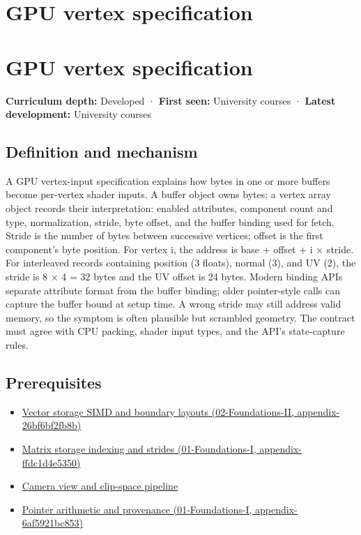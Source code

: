\hypertarget{appendix-749ba51a6c25}{}
\section*{GPU vertex specification}
\section{GPU vertex specification}\label{gpu-vertex-specification}

\textbf{Curriculum depth:} Developed · \textbf{First seen:} University courses · \textbf{Latest development:} University courses

\subsection{Definition and mechanism}\label{definition-and-mechanism}

A GPU vertex-input specification explains how bytes in one or more buffers become per-vertex shader inputs. A buffer object owns bytes; a vertex array object records their interpretation: enabled attributes, component count and type, normalization, stride, byte offset, and the buffer binding used for fetch. Stride is the number of bytes between successive vertices; offset is the first component's byte position. For vertex i, the address is base + offset + i × stride. For interleaved records containing position (3 floats), normal (3), and UV (2), the stride is 8 × 4 = 32 bytes and the UV offset is 24 bytes. Modern binding APIs separate attribute format from the buffer binding; older pointer-style calls can capture the buffer bound at setup time. A wrong stride may still address valid memory, so the symptom is often plausible but scrambled geometry. The contract must agree with CPU packing, shader input types, and the API's state-capture rules.

\subsection{Prerequisites}\label{prerequisites}

\begin{itemize}
\tightlist
\item
  \href{}{Vector storage SIMD and boundary layouts (02-Foundations-II, appendix-26bf6bf2fb8b)}
\item
  \href{}{Matrix storage indexing and strides (01-Foundations-I, appendix-ffdc1d4e5350)}
\item
  \hyperref[appendix-1c07d64f5e70]{Camera view and clip-space pipeline}
\item
  \href{}{Pointer arithmetic and provenance (01-Foundations-I, appendix-6af5921bc853)}
\end{itemize}

